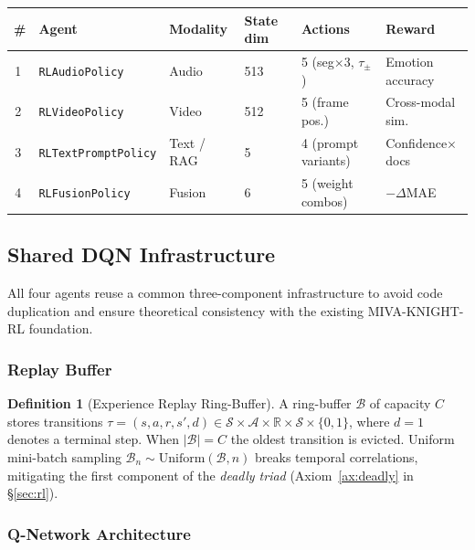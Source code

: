 \documentclass[12pt,a4paper]{article}
\theoremstyle{definition}
\newtheorem{definition}{Definition}[section]
\theoremstyle{plain}
\theoremstyle{remark}
\newcommand{\R}{\mathbb{R}}
\begin{document}
\begin{tcolorbox}[keybox,title={Four RL Injection Points --- Summary}]
\begin{tabular}{clllll}
\toprule
\textbf{\#} & \textbf{Agent} & \textbf{Modality} & \textbf{State dim} & \textbf{Actions} & \textbf{Reward} \\
\midrule
\textcircled{1} & \texttt{RLAudioPolicy}  & Audio          & 513 & 5 (seg$\times$3, $\tau_{\pm}$) & Emotion accuracy \\
\textcircled{2} & \texttt{RLVideoPolicy}  & Video          & 512 & 5 (frame pos.)                 & Cross-modal sim. \\
\textcircled{3} & \texttt{RLTextPromptPolicy} & Text / RAG & 5   & 4 (prompt variants)            & Confidence$\times$docs \\
\textcircled{4} & \texttt{RLFusionPolicy} & Fusion         & 6   & 5 (weight combos)              & $-\Delta$MAE \\
\bottomrule
\end{tabular}
\end{tcolorbox}

\subsection{Shared DQN Infrastructure}
\label{sec:rl_infra}

All four agents reuse a common three-component infrastructure to avoid code
duplication and ensure theoretical consistency with the existing
MIVA-KNIGHT-RL foundation.

\subsubsection{Replay Buffer}

\begin{definition}[Experience Replay Ring-Buffer]
A ring-buffer $\mathcal{B}$ of capacity $C$ stores transitions
$\tau = (s, a, r, s', d) \in \mathcal{S}\times\mathcal{A}\times\R
\times\mathcal{S}\times\{0,1\}$, where $d=1$ denotes a terminal step.
When $|\mathcal{B}| = C$ the oldest transition is evicted.
Uniform mini-batch sampling $\mathcal{B}_n \sim \text{Uniform}(\mathcal{B},n)$
breaks temporal correlations, mitigating the first component of the
\emph{deadly triad} (Axiom~\ref{ax:deadly} in \S\ref{sec:rl}).
\end{definition}

\subsubsection{Q-Network Architecture}
\end{document}
